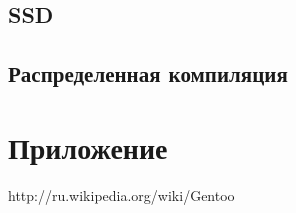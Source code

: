 \documentclass[12pt, a4paper]{article}
\begin{document}
\subsection{SSD}

\subsection{Распределенная компиляция}

\newpage

\section{Приложение}


\newpage
\begin{thebibliography}{99}

	 http://ru.wikipedia.org/wiki/Gentoo
	
	

\end{thebibliography}
\end{document}

